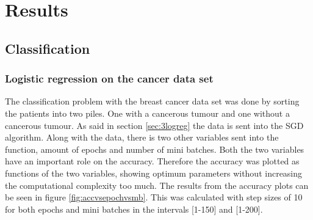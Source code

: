 \documentclass[../main.tex]{subfiles}
\begin{document}
\section{Results}
\subsection{Classification}
\subsubsection{Logistic regression on the cancer data set}
The classification problem with the breast cancer data set was done by sorting the patients into two piles. One with a cancerous tumour and one without a cancerous tumour. As said in section \ref{sec:3logreg} the data is sent into the SGD algorithm. Along with the data, there is two other variables sent into the function, amount of epochs and number of mini batches. Both the two variables have an important role on the accuracy. Therefore the accuracy was plotted as functions of the two variables, showing optimum parameters without increasing the computational complexity too much. The results from the accuracy plots can be seen in figure \ref{fig:accvsepochvsmb}. This was calculated with step sizes of 10 for both epochs and mini batches in the intervals [1-150] and [1-200].
\end{document}
